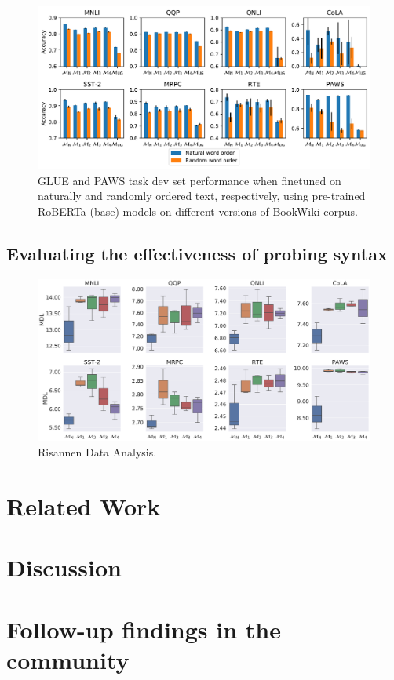 \documentclass[letterpaper, 12pt]{report}
\begin{document}
\begin{figure}[htbp]
\centering
\includegraphics[width=.9\linewidth]{figs/unnat_pt/finetune_rand.pdf}
\caption{GLUE and PAWS task dev set performance when finetuned on naturally and randomly ordered text, respectively, using pre-trained RoBERTa (base) models on different versions of BookWiki corpus.}
\end{figure}

\subsection{Evaluating the effectiveness of probing syntax}
\label{sec:orgde81009}

\begin{figure}[htbp]
\centering
\includegraphics[width=.9\linewidth]{figs/unnat_pt/rda_mdl_ep_3.pdf}
\caption{Risannen Data Analysis.}
\end{figure}

\section{Related Work}
\label{sec:orgc510385}
\section{Discussion}
\label{sec:org25a2834}
\section{Follow-up findings in the community}
\label{sec:orgf893721}
\clearpage
\end{document}
